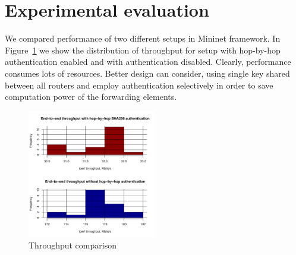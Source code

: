 \section{Experimental evaluation}
\label{section:experiments}

We compared performance of two different setups in Mininet framework. 
In Figure~\ref{fig:tput} we show the distribution of throughput for 
setup with hop-by-hop authentication enabled and with authentication disabled.
Clearly, performance consumes lots of resources. Better design can consider,
using single key shared between all routers and employ authentication selectively
in order to save computation power of the forwarding elements.

\begin{figure}[!h]
        \includegraphics[width=0.5\textwidth]{graphics/throughput.pdf}
        \caption{Throughput comparison}
        \label{fig:tput}
\end{figure}
